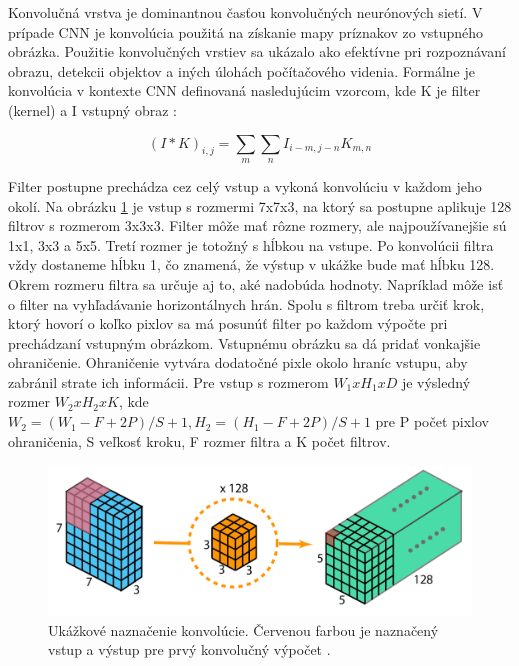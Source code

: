 Konvolučná vrstva je dominantnou časťou konvolučných neurónových sietí. V prípade CNN je konvolúcia použitá na získanie mapy príznakov zo vstupného obrázka. Použitie konvolučných vrstiev sa ukázalo ako efektívne pri rozpoznávaní obrazu, detekcii objektov a iných úlohách počítačového videnia. Formálne je konvolúcia v kontexte CNN definovaná nasledujúcim vzorcom, kde K je filter (kernel) a I vstupný obraz \cite{cnn-intro}:

\begingroup
\large
\begin{equation}
(I*K)_{i,j} = \sum_{m} \sum_{n} I_{i-m, j-n} K_{m,n}
\end{equation}
\endgroup

Filter postupne prechádza cez celý vstup a vykoná konvolúciu v každom jeho okolí. Na obrázku \ref{img:conv} je vstup s rozmermi 7x7x3, na ktorý sa postupne aplikuje 128 filtrov s rozmerom 3x3x3. Filter môže mať rôzne rozmery, ale najpoužívanejšie sú 1x1, 3x3 a 5x5. Tretí rozmer je totožný s hĺbkou na vstupe. Po konvolúcii filtra vždy dostaneme hĺbku 1, čo znamená, že výstup v ukážke bude mať hĺbku 128. Okrem rozmeru filtra sa určuje aj to, aké nadobúda hodnoty. Napríklad môže isť o filter na vyhľadávanie horizontálnych hrán. Spolu s filtrom treba určiť krok, ktorý hovorí o koľko pixlov sa má posunúť filter po každom výpočte pri prechádzaní vstupným obrázkom. Vstupnému obrázku sa dá pridať vonkajšie ohraničenie. Ohraničenie vytvára dodatočné pixle okolo hraníc vstupu, aby zabránil strate ich informácii. Pre vstup s rozmerom \begin{math}W_1xH_1xD\end{math} je výsledný rozmer \begin{math}W_2xH_2xK\end{math}, kde \begin{math}W_2 = (W_1 - F + 2P)/S + 1, H_2 = (H_1 - F + 2P)/S + 1\end{math} pre P počet pixlov ohraničenia, S veľkosť kroku, F rozmer filtra a K počet filtrov.

\begin{figure}[ht]
    \centering
    \includegraphics[width=.7\textwidth]{images/02/filters2.png}
    \caption{Ukážkové naznačenie konvolúcie. Červenou farbou je naznačený vstup a výstup pre prvý konvolučný výpočet \cite{filters}. }
    \label{img:conv}
\end{figure}

